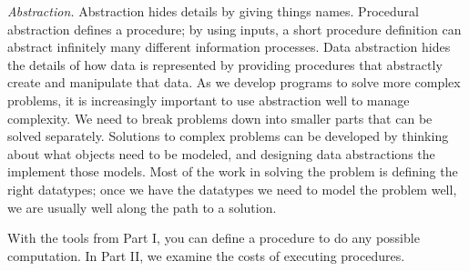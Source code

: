 \begin{schemeregion}
\emph{Abstraction.} Abstraction hides details by giving things names.  Procedural abstraction defines a procedure; by using inputs, a short procedure definition can abstract infinitely many different information processes.  Data abstraction hides the details of how data is represented by providing procedures that abstractly create and manipulate that data.  As we develop programs to solve more complex problems, it is increasingly important to use abstraction well to manage complexity.  We need to break problems down into smaller parts that can be solved separately.  Solutions to complex problems can be developed by thinking about what objects need to be modeled, and designing data abstractions the implement those models.  Most of the work in solving the problem is defining the right datatypes; once we have the datatypes we need to model the problem well, we are usually well along the path to a solution.

With the tools from Part I, you can define a procedure to do any possible computation.  In Part II, we examine the costs of executing procedures.
\end{schemeregion}

